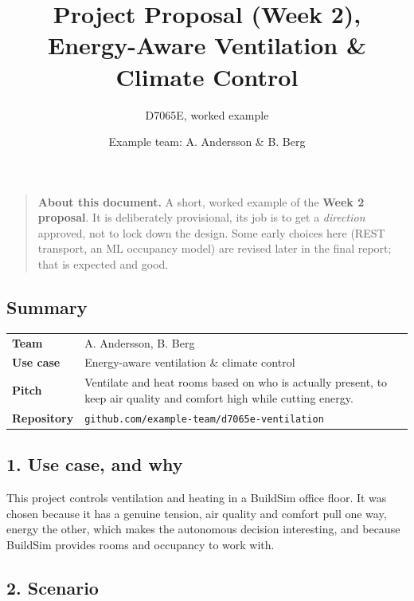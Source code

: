 \documentclass[
  11pt,
]{article}
\title{Project Proposal (Week 2), Energy-Aware Ventilation \& Climate
Control}
\subtitle{D7065E, worked example}
\author{Example team: A. Andersson \& B. Berg}
\date{}
\begin{document}
\maketitle

\begin{quote}
\textbf{About this document.} A short, worked example of the
\textbf{Week 2 proposal}. It is deliberately provisional, its job is
to get a \emph{direction} approved, not to lock down the design. Some
early choices here (REST transport, an ML occupancy model) are revised
later in the final report; that is expected and good.
\end{quote}

\hypertarget{summary}{%
\subsection{Summary}\label{summary}}

\begin{longtable}[]{@{}
  >{\raggedright\arraybackslash}p{}
  >{\raggedright\arraybackslash}p{}@{}}
\toprule
\endhead
\textbf{Team} & A. Andersson, B. Berg \\
\textbf{Use case} & Energy-aware ventilation \& climate control \\
\textbf{Pitch} & Ventilate and heat rooms based on who is actually
present, to keep air quality and comfort high while cutting energy. \\
\textbf{Repository} &
\texttt{github.com/example-team/d7065e-ventilation} \\
\bottomrule
\end{longtable}

\hypertarget{use-case-and-why}{%
\subsection{1. Use case, and why}\label{use-case-and-why}}

This project controls ventilation and heating in a BuildSim office
floor. It was chosen because it has a genuine tension, air quality and
comfort pull one way, energy the other, which makes the autonomous
decision interesting, and because BuildSim provides rooms and occupancy
to work with.

\hypertarget{scenario}{%
\subsection{2. Scenario}\label{scenario}}
\end{document}

